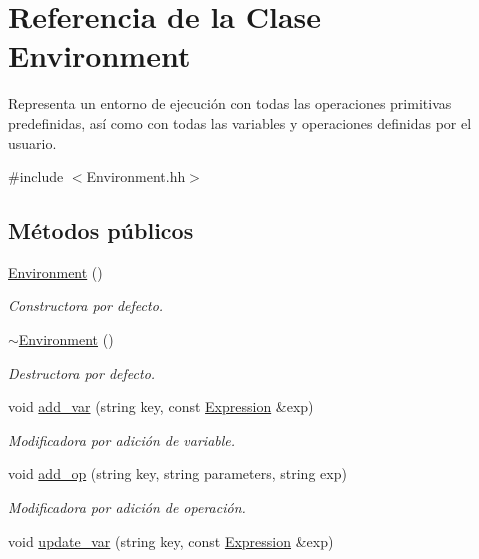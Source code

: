 \hypertarget{class_environment}{}\section{Referencia de la Clase Environment}
\label{class_environment}


Representa un entorno de ejecución con todas las operaciones primitivas predefinidas, así como con todas las variables y operaciones definidas por el usuario.  




{\ttfamily \#include $<$Environment.\+hh$>$}

\subsection*{Métodos públicos}
\begin{DoxyCompactItemize}
\item 
\hyperlink{class_environment_a8b427c4448d8b7536666837521b9e83d}{Environment} ()
\begin{DoxyCompactList}\small\item\em Constructora por defecto. \end{DoxyCompactList}\item 
\hyperlink{class_environment_a8e294735187880dd3d59be10c425b29d}{$\sim$\+Environment} ()
\begin{DoxyCompactList}\small\item\em Destructora por defecto. \end{DoxyCompactList}\item 
void \hyperlink{class_environment_a91f41963e52433c24a3eb6f6ae166405}{add\+\_\+var} (string key, const \hyperlink{class_expression}{Expression} \&exp)
\begin{DoxyCompactList}\small\item\em Modificadora por adición de variable. \end{DoxyCompactList}\item 
void \hyperlink{class_environment_afc69edbc9bba5ce3a28879911b008a37}{add\+\_\+op} (string key, string parameters, string exp)
\begin{DoxyCompactList}\small\item\em Modificadora por adición de operación. \end{DoxyCompactList}\item 
void \hyperlink{class_environment_a79d9dcc0638b7a5bc4e56c95ba7db81b}{update\+\_\+var} (string key, const \hyperlink{class_expression}{Expression} \&exp)

\end{DoxyCompactItemize}

